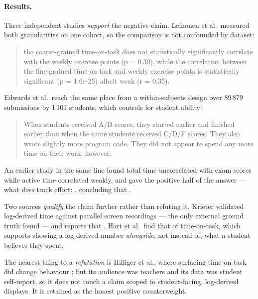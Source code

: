 \paragraph{Results.}
Three independent studies \emph{support} the negative claim.  Leinonen et
al.\ measured both granularities on one cohort, so the comparison is not
confounded by dataset:
\blockcquote[sec.~4.1]{leinonen2022timeontask}{the coarse-grained
time-on-task does not statistically significantly correlate with the weekly
exercise points (p = 0.39), while the correlation between the fine-grained
time-on-task and weekly exercise points is statistically significant (p =
1.6e-25) albeit weak (r = 0.35).}
Edwards et al.\ reach the same place from a within-subjects design over
89\,879 submissions by 1\,101 students, which controls for student ability:
\blockcquote{edwards2009comparing}{When students received A/B scores, they
started earlier and finished earlier than when the same students received
C/D/F scores. They also wrote slightly more program code. They did not
appear to spend any more time on their work, however.}
An earlier study in the same line found total time uncorrelated with exam
scores while active time correlated weakly, and gave the positive half of
the answer --- what \emph{does} track effort:
, concluding
that .

Two sources \emph{qualify} the claim further rather than refuting it.
Krieter validated log-derived time against parallel screen recordings ---
the only external ground truth found --- and reports that
.
Hart et al.\ find that
 of time-on-task, which supports
showing a log-derived number \emph{alongside}, not instead of, what a
student believes they spent.

The nearest thing to a \emph{refutation} is Hilliger et al., where
surfacing time-on-task did change behaviour \autocite{hilliger2021evaluating};
but its audience was teachers and its data was student self-report, so it
does not touch a claim scoped to student-facing, log-derived displays.  It
is retained as the honest positive counterweight.

